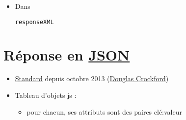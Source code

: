 \begin{itemize}
\tightlist
\item
  Dans
  \begin{otherlanguage}{english}\texttt{responseXML}\end{otherlanguage}
\end{itemize}

\hypertarget{ruxe9ponse-en-json19}{%
\section{\texorpdfstring{Réponse en
\href{http://www.json.org/}{JSON}}{Réponse en JSON}}\label{ruxe9ponse-en-json19}}

\begin{itemize}
\tightlist
\item
  \href{http://www.ecma-international.org/publications/files/ECMA-ST/ECMA-404.pdf}{Standard}
  depuis octobre 2013 (\href{http://www.crockford.com/}{Douglas
  Crockford})
\item
  Tableau d'objets js :

  \begin{itemize}
  \tightlist
  \item
    pour chacun, ses attributs sont des paires clé:valeur
  \end{itemize}
\end{itemize}

\begin{otherlanguage}{english}

\begin{Shaded}
\begin{Highlighting}[]
\FunctionTok{\{} \FunctionTok{:}  \ErrorTok{:} \FunctionTok{,} \FunctionTok{:} \FunctionTok{\}}

\OtherTok{[}\OtherTok{,} \OtherTok{,} \OtherTok{]}

\OtherTok{[}
    \FunctionTok{\{}\FunctionTok{:}\FunctionTok{,}  \FunctionTok{:}\FunctionTok{\}}\OtherTok{,}
    \FunctionTok{\{}\FunctionTok{:}\FunctionTok{,}   \FunctionTok{:}\FunctionTok{\}}\OtherTok{,}
    \FunctionTok{\{}\FunctionTok{:}\FunctionTok{,}     \FunctionTok{:}\FunctionTok{\}}
\OtherTok{]}
\end{Highlighting}
\end{Shaded}

\end{otherlanguage}

